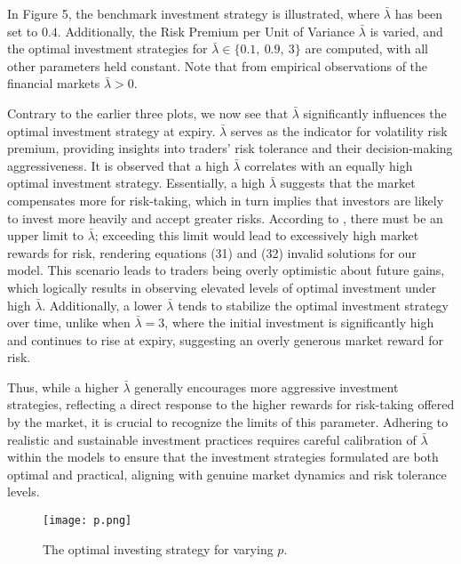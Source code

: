 \documentclass[11pt]{article}
\numberwithin{equation}{section}
\begin{document}
In Figure 5, the benchmark investment strategy is illustrated, where $\bar{\lambda}$ has
been set to $0.4$. Additionally, the Risk Premium per Unit of Variance $\bar{\lambda}$ is varied, and the
optimal investment strategies for $\bar{\lambda} \in \{0.1,\: 0.9, \:3\}$ are computed,
with all other parameters held constant. Note that from empirical observations of
the financial markets $\bar{\lambda}>0$.

Contrary to the earlier three plots, we now see that $\bar{\lambda}$
significantly influences the optimal investment strategy at expiry.
$\bar{\lambda}$ serves as the indicator for volatility risk premium, providing
insights into traders' risk tolerance and their decision-making aggressiveness.
It is observed that a high $\bar{\lambda}$ correlates with an equally high
optimal investment strategy. Essentially, a high $\bar{\lambda}$ suggests that
the market compensates more for risk-taking, which in turn implies that
investors are likely to invest more heavily and accept greater risks. According
to \cite{kraft2005optimal}, there must be an upper limit to $\bar{\lambda}$;
exceeding this limit would lead to excessively high market rewards for risk,
rendering equations (31) and (32) invalid solutions for our model. This scenario leads to
traders being overly optimistic about future gains, which logically results in
observing elevated levels of optimal investment under high $\bar{\lambda}$.
Additionally, a lower $\bar{\lambda}$ tends to stabilize the optimal investment
strategy over time, unlike when $\bar{\lambda} = 3$, where the initial
investment is significantly high and continues to rise at expiry, suggesting an
overly generous market reward for risk.

Thus, while a higher $\bar{\lambda}$ generally encourages more aggressive
investment strategies, reflecting a direct response to the higher rewards for
risk-taking offered by the market, it is crucial to recognize the limits of this
parameter. Adhering to realistic and sustainable investment practices requires
careful calibration of $\bar{\lambda}$ within the models to ensure that the
investment strategies formulated are both optimal and practical, aligning with
genuine market dynamics and risk tolerance levels.
\newpage
\begin{figure}[!h]
    \centering
    \hspace*{-2cm}
    \texttt{[image: p.png]}
    \label{Figure 6}
    \setlength{\abovecaptionskip}{-5pt}
    \caption{The optimal investing strategy for varying $p$.}
\end{figure}
\end{document}
